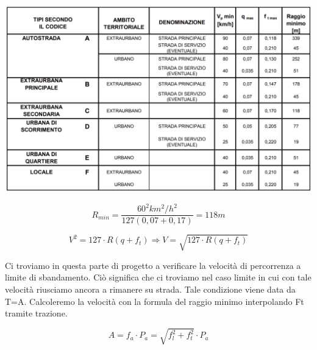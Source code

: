 \documentclass[
a4paper,
12pt, 
twoside]{scrbook}
\begin{document}
{{{{{{   \includegraphics[width=\textwidth]{immagini/qmax.png} 	
    	
   \begin{equation}
   	R_{min}=\frac{60^2km^2/h^2}{127(0,07+0,17)}=118m
   \end{equation}
   
   \begin{equation}
   	V^2=127\cdot R(q+f_t)\Rightarrow V=\sqrt{127\cdot R(q+f_t)}
   \end{equation} 
    	
   \begin{boxF}
   	Ci troviamo in questa parte di progetto a verificare la velocità di percorrenza a limite di sbandamento. Ciò significa che ci troviamo nel caso limite in cui con tale velocità riusciamo ancora a rimanere su strada. Tale condizione viene data da T=A. Calcoleremo la velocità con la formula del raggio minimo interpolando Ft tramite trazione.
   \end{boxF} 	
   
   \begin{equation}
   	A=f_a\cdot P_a=\sqrt{f^{2}_l+f^{2}_t}\cdot P_a
   \end{equation} 
   
   {
   	\centering
   	
}}}}}}}
\end{document}
